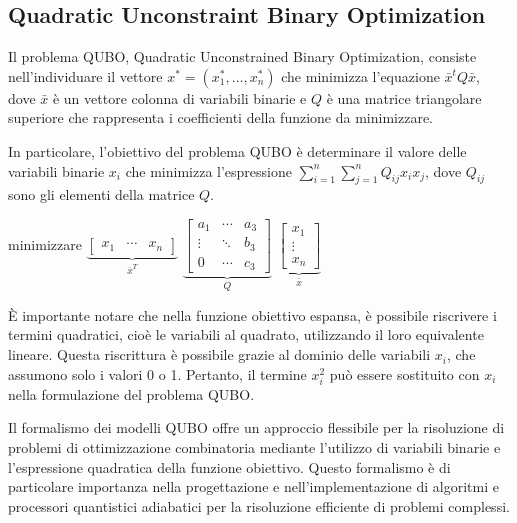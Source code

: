 \documentclass{article}
\begin{document}
\subsection{Quadratic Unconstraint Binary Optimization}
Il problema QUBO, Quadratic Unconstrained Binary Optimization, consiste nell'individuare il vettore $x^* = (x_1^*, \dots, x_n^*)$ che minimizza l'equazione $\bar{x}^tQ\bar{x}$, dove $\bar{x}$ è un vettore colonna di variabili binarie e $Q$ è una matrice triangolare superiore che rappresenta i coefficienti della funzione da minimizzare.

In particolare, l'obiettivo del problema QUBO è determinare il valore delle variabili binarie $x_i$ che minimizza l'espressione $\sum_{i=1}^{n} \sum_{j=1}^{n} Q_{ij} x_i x_j$, dove $Q_{ij}$ sono gli elementi della matrice $Q$.

\begin{center}
    minimizzare 
    $\underbrace{\begin{bmatrix}
        x_1 & \cdots & x_n 
    \end{bmatrix}}_{\bar{x}^T}$ 
    $\underbrace{\begin{bmatrix}
        a_1 & \cdots & a_3 \\
        \vdots & \ddots & b_3 \\
        0 & \cdots & c_3 
    \end{bmatrix}}_{Q}$ 
    $\underbrace{\begin{bmatrix}
        x_1 \\
        \vdots \\
        x_n 
    \end{bmatrix}}_{\bar{x}}$       
\end{center}

È importante notare che nella funzione obiettivo espansa, è possibile riscrivere i termini quadratici, cioè le variabili al quadrato, utilizzando il loro equivalente lineare. Questa riscrittura è possibile grazie al dominio delle variabili $x_i$, che assumono solo i valori 0 o 1. Pertanto, il termine $x_i^2$ può essere sostituito con $x_i$ nella formulazione del problema QUBO.

Il formalismo dei modelli QUBO offre un approccio flessibile per la risoluzione di problemi di ottimizzazione combinatoria mediante l'utilizzo di variabili binarie e l'espressione quadratica della funzione obiettivo. Questo formalismo è di particolare importanza nella progettazione e nell'implementazione di algoritmi e processori quantistici adiabatici per la risoluzione efficiente di problemi complessi.
\end{document}
